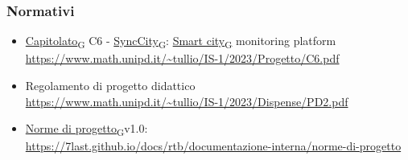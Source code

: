 \subsubsection{Normativi}
\begin{itemize}
	\item \href{https://7last.github.io/docs/rtb/documentazione-interna/glossario\#capitolato}{Capitolato\textsubscript{G}} C6 - \href{https://7last.github.io/docs/rtb/documentazione-interna/glossario\#synccity}{SyncCity\textsubscript{G}}: \href{https://7last.github.io/docs/rtb/documentazione-interna/glossario\#smart-city}{Smart city\textsubscript{G}} monitoring platform\\
	      \url{https://www.math.unipd.it/~tullio/IS-1/2023/Progetto/C6.pdf}
	\item Regolamento di progetto didattico\\
	      \url{https://www.math.unipd.it/~tullio/IS-1/2023/Dispense/PD2.pdf}
	\item \href{https://7last.github.io/docs/rtb/documentazione-interna/glossario\#norme-di-progetto}{Norme di progetto\textsubscript{G}}v1.0:\\
	\url{https://7last.github.io/docs/rtb/documentazione-interna/norme-di-progetto}
\end{itemize}
\newpage